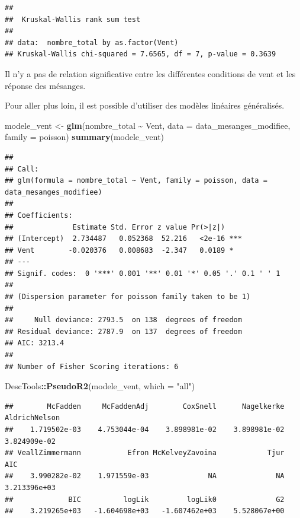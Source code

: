 \documentclass[
  french,
]{article}
\newenvironment{Shaded}{\begin{snugshade}}{\end{snugshade}}
\newcommand{\AttributeTok}[1]{\textcolor[rgb]{0.13,0.29,0.53}{#1}}
\newcommand{\FunctionTok}[1]{\textcolor[rgb]{0.13,0.29,0.53}{\textbf{#1}}}
\newcommand{\NormalTok}[1]{#1}
\newcommand{\OtherTok}[1]{\textcolor[rgb]{0.56,0.35,0.01}{#1}}
\newcommand{\SpecialCharTok}[1]{\textcolor[rgb]{0.81,0.36,0.00}{\textbf{#1}}}
\newcommand{\StringTok}[1]{\textcolor[rgb]{0.31,0.60,0.02}{#1}}
\begin{document}
\begin{verbatim}
## 
##  Kruskal-Wallis rank sum test
## 
## data:  nombre_total by as.factor(Vent)
## Kruskal-Wallis chi-squared = 7.6565, df = 7, p-value = 0.3639
\end{verbatim}

Il n'y a pas de relation significative entre les différentes conditions
de vent et les réponse des mésanges.

Pour aller plus loin, il est possible d'utiliser des modèles linéaires
généralisés.

\begin{Shaded}
\begin{Highlighting}[]
\NormalTok{modele\_vent }\OtherTok{\textless{}{-}} \FunctionTok{glm}\NormalTok{(nombre\_total }\SpecialCharTok{\textasciitilde{}}\NormalTok{ Vent, }\AttributeTok{data =}\NormalTok{ data\_mesanges\_modifiee, }\AttributeTok{family =}\NormalTok{ poisson)}
\FunctionTok{summary}\NormalTok{(modele\_vent)}
\end{Highlighting}
\end{Shaded}

\begin{verbatim}
## 
## Call:
## glm(formula = nombre_total ~ Vent, family = poisson, data = data_mesanges_modifiee)
## 
## Coefficients:
##              Estimate Std. Error z value Pr(>|z|)    
## (Intercept)  2.734487   0.052368  52.216   <2e-16 ***
## Vent        -0.020376   0.008683  -2.347   0.0189 *  
## ---
## Signif. codes:  0 '***' 0.001 '**' 0.01 '*' 0.05 '.' 0.1 ' ' 1
## 
## (Dispersion parameter for poisson family taken to be 1)
## 
##     Null deviance: 2793.5  on 138  degrees of freedom
## Residual deviance: 2787.9  on 137  degrees of freedom
## AIC: 3213.4
## 
## Number of Fisher Scoring iterations: 6
\end{verbatim}

\begin{Shaded}
\begin{Highlighting}[]
\NormalTok{DescTools}\SpecialCharTok{::}\FunctionTok{PseudoR2}\NormalTok{(modele\_vent, }\AttributeTok{which =} \StringTok{"all"}\NormalTok{)}
\end{Highlighting}
\end{Shaded}

\begin{verbatim}
##        McFadden     McFaddenAdj        CoxSnell      Nagelkerke   AldrichNelson 
##    1.719502e-03    4.753044e-04    3.898981e-02    3.898981e-02    3.824909e-02 
## VeallZimmermann           Efron McKelveyZavoina            Tjur             AIC 
##    3.990282e-02    1.971559e-03              NA              NA    3.213396e+03 
##             BIC          logLik         logLik0              G2 
##    3.219265e+03   -1.604698e+03   -1.607462e+03    5.528067e+00
\end{verbatim}
\end{document}

